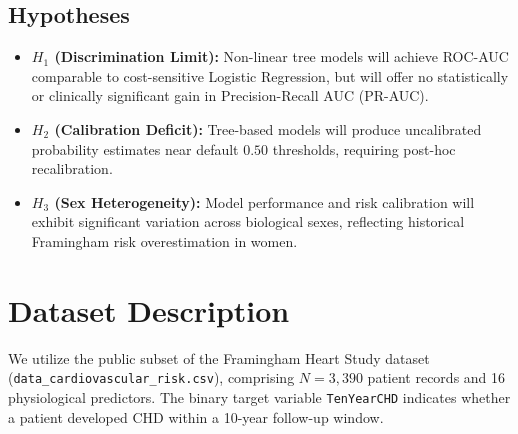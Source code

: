 \documentclass[manuscript, screen, review]{jair}
\begin{document}
\subsection{Hypotheses}
\begin{itemize}
    \item \textbf{$H_1$ (Discrimination Limit):} Non-linear tree models will achieve ROC-AUC comparable to cost-sensitive Logistic Regression, but will offer no statistically or clinically significant gain in Precision-Recall AUC (PR-AUC).
    \item \textbf{$H_2$ (Calibration Deficit):} Tree-based models will produce uncalibrated probability estimates near default $0.50$ thresholds, requiring post-hoc recalibration.
    \item \textbf{$H_3$ (Sex Heterogeneity):} Model performance and risk calibration will exhibit significant variation across biological sexes, reflecting historical Framingham risk overestimation in women.
\end{itemize}

\section{Dataset Description}
We utilize the public subset of the Framingham Heart Study dataset (\texttt{data\_cardiovascular\_risk.csv}), comprising $N = 3,390$ patient records and 16 physiological predictors. The binary target variable \texttt{TenYearCHD} indicates whether a patient developed CHD within a 10-year follow-up window.
\end{document}
